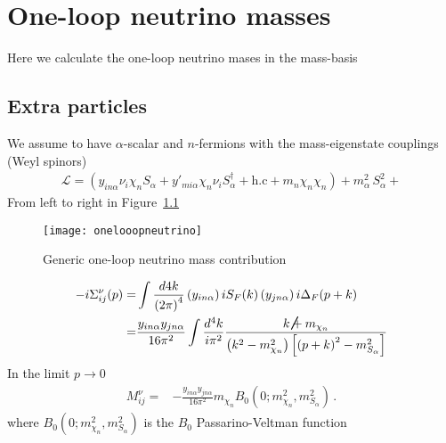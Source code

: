 \chapter{One-loop neutrino masses}
Here we calculate the one-loop neutrino mases in the mass-basis

\section{Extra particles}
We assume to have $\alpha$-scalar and $n$-fermions with the mass-eigenstate couplings (Weyl spinors)
\begin{align}
  \mathcal{L}=\left(y_{in\alpha}\nu_{i}\chi_n S_{\alpha}+y'_{mi\alpha}\chi_n\nu_{i} S_{\alpha}^{\dagger}+\text{h.c}+m_n \chi_n\chi_n  \right)+m_{\alpha}^2\,S_{\alpha}^2+
\end{align}
From left to right in Figure~\ref{fig:1lnu}
\begin{figure}
  \centering
  \texttt{[image: onelooopneutrino]}
  \caption{Generic one-loop neutrino mass contribution}
  \label{fig:1lnu}
\end{figure}
\begin{align}
-i\Sigma^{\nu}_{ij}(p)=&\int \frac{d4k}{\left( 2\pi \right)^{4}}\left(y_{in\alpha}  \right)iS_F(k) \left(y_{jn\alpha}\right)i\Delta_F(p+k) \nonumber\\
=&\frac{y_{i n\alpha}y_{j n\alpha}}{16\pi^2}\int \frac{d^4k}{i\pi^2}\frac{\cancel{k}+m_{\chi_n}}{\left(k^2-m_{\chi_n}^2  \right)\left[\left(p+k\right)^2-m_{S_\alpha}^2\right]}
\end{align}
In the limit $p\to 0$
\begin{align}
\label{eq:mnub0}
   M^{\nu}_{ij}=&-\frac{y_{i n\alpha}y_{j n\alpha}}{16\pi^2}m_{\chi_n} B_0 \left( 0;m_{\chi_n}^2,m_{S_{\alpha}}^2 \right) \,.
\end{align}
where $B_0\left
(0;m_{\chi_n}^2,m^2_{S_{\alpha}} \right)$ is the $B_0$ Passarino-Veltman function~\cite{Passarino:1978jh}


